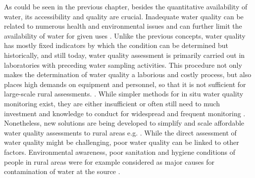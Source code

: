 {As could be seen in the previous chapter, besides the quantitative availability of water, its accessibility and quality are crucial. Inadequate water quality can be related to numerous health and environmental issues and can further limit the availability of water for given uses \autocite{rcrcFORECASTBASEDFINANCINGEARLY2020, faoCopingWaterScarcity2012}. Unlike the previous concepts, water quality has mostly fixed indicators by which the condition can be determined but historically, and still today, water quality assessment is primarily carried out in laboratories with preceding water sampling activities. This procedure not only makes the determination of water quality a laborious and costly process, but also places high demands on equipment and personnel, so that it is not sufficient for large-scale rural assessments. \autocite{tariqOpenSourceWater2021,worldmeteorologicalorganizationPlanningWaterqualityMonitoring2013}. While simpler methods for in situ water quality monitoring exist, they are either insufficient or often still need to much investment and knowledge to conduct for widespread and frequent monitoring \autocite{worldmeteorologicalorganizationPlanningWaterqualityMonitoring2013}. Nonetheless, new solutions are being developed to simplify and scale affordable water quality assessments to rural areas e.g. \autocite{ighaloComprehensiveReviewWater2020,tariqOpenSourceWater2021}. While the direct assessment of water quality might be challenging, poor water quality can be linked to other factors. Environmental awareness, poor sanitation and hygiene conditions of people in rural areas were for example considered as major causes for contamination of water at the source \autocite{zamxakaMicrobiologicalPhysicochemicalAssessment2004}.

}
